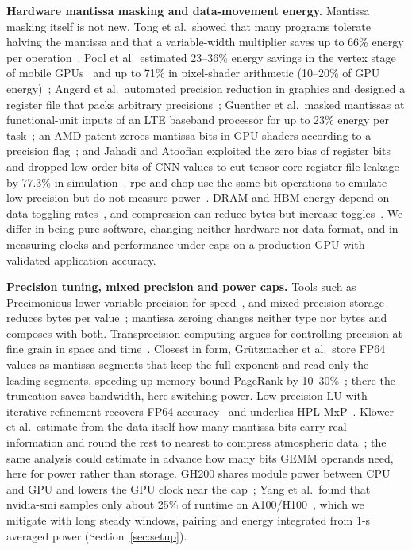 \documentclass[conference]{IEEEtran}
\newcommand{\pct}{\%}
\begin{document}
\textbf{Hardware mantissa masking and data-movement energy.} Mantissa masking itself is not new. Tong et al.\
showed that many programs tolerate halving the mantissa and that a variable-width multiplier saves up to 66\pct{}
energy per operation~\cite{Tong2000}. Pool et al.\ estimated 23--36\pct{} energy savings in the vertex stage of
mobile GPUs~\cite{Pool2008} and up to 71\pct{} in pixel-shader arithmetic (10--20\pct{} of GPU
energy)~\cite{Pool2011}; Angerd et al.\ automated precision reduction in graphics and designed a register file that
packs arbitrary precisions~\cite{Angerd2017}; Guenther et al.\ masked mantissas at functional-unit inputs of an LTE
baseband processor for up to 23\pct{} energy per task~\cite{Guenther2016}; an AMD patent zeroes mantissa bits in
GPU shaders according to a precision flag~\cite{AMD2022}; and Jahadi and Atoofian exploited the zero bias of
register bits and dropped low-order bits of CNN values to cut tensor-core register-file leakage by
77.3\pct{} in simulation~\cite{Jahadi2024}. rpe and chop use the same bit operations to emulate low precision but
do not measure power~\cite{Dawson2017,Higham2019}. DRAM and HBM energy depend on data toggling
rates~\cite{Chatterjee2017,OConnor2017,Ghose2018}, and compression can reduce bytes but increase
toggles~\cite{Pekhimenko2016}. We differ in being pure software, changing neither hardware nor data format, and in
measuring clocks and performance under caps on a production GPU with validated application accuracy.

\textbf{Precision tuning, mixed precision and power caps.} Tools such as Precimonious lower variable precision for
speed~\cite{RubioGonzalez2013}, and mixed-precision storage reduces bytes per value~\cite{Higham2022}; mantissa
zeroing changes neither type nor bytes and composes with both. Transprecision computing argues for controlling
precision at fine grain in space and time~\cite{Malossi2018}. Closest in form, Grützmacher et al.\ store FP64 values
as mantissa segments that keep the full exponent and read only the leading segments, speeding up memory-bound
PageRank by 10--30\pct~\cite{Grutzmacher2020}; there the truncation saves bandwidth, here switching power.
Low-precision LU with iterative refinement recovers FP64 accuracy~\cite{Haidar2018} and underlies
HPL-MxP~\cite{Dongarra2025}. Klöwer et al.\ estimate from the data itself how many mantissa bits carry real
information and round the rest to nearest to compress atmospheric data~\cite{Klower2021}; the same analysis could
estimate in advance how many bits GEMM operands need, here for power rather than storage. GH200 shares module power
between CPU and GPU and lowers the GPU clock near the cap~\cite{Patrou2025}; Yang et al.\ found that nvidia-smi
samples only about 25\pct{} of runtime on A100/H100~\cite{Yang2024}, which we mitigate with long steady windows,
pairing and energy integrated from 1-s averaged power (Section~\ref{sec:setup}).
\end{document}

